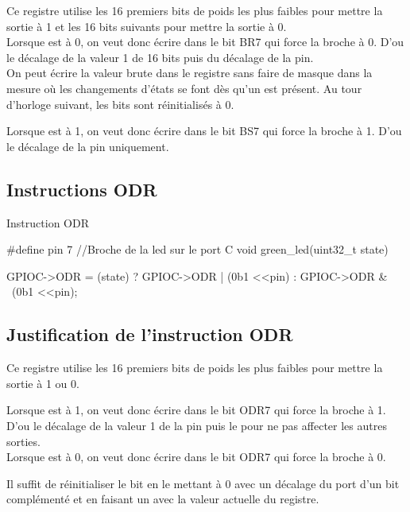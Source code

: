 Ce registre utilise les 16 premiers bits de poids les plus faibles pour mettre la sortie à 1 et 
les 16 bits suivants pour mettre la sortie à 0. \\

Lorsque  est à 0, on veut donc écrire dans le bit BR7 qui force la broche à 0. 
D'ou le décalage de la valeur 1 de 16 bits puis du décalage de la pin. \\
On peut écrire la valeur brute dans le registre sans faire de masque dans la mesure où 
les changements d'états se font dès qu'un  est présent. Au tour d'horloge suivant, les bits sont réinitialisés à 0.

Lorsque  est à 1, on veut donc écrire dans le bit BS7 qui force la broche à 1. 
D'ou le décalage de la pin uniquement. \\



\subsection{Instructions ODR}

\begin{Cpp}{Instruction ODR}
  
  #define pin 7 //Broche de la led sur le port C
  void green_led(uint32_t state) {

    GPIOC->ODR = (state) ? GPIOC->ODR | (0b1 <<pin) : GPIOC->ODR & ~(0b1 <<pin);
     
  }
  

\end{Cpp}

\subsection{Justification de l'instruction ODR}

Ce registre utilise les 16 premiers bits de poids les plus faibles pour mettre la sortie à 1 ou 0.

Lorsque  est à 1, on veut donc écrire dans le bit ODR7 qui force la broche à 1. D'ou le décalage de la valeur 1 de la pin puis le  pour ne pas affecter les autres sorties. \\


Lorsque  est à 0, on veut donc écrire dans le bit ODR7 qui force la broche à 0. 

Il suffit de réinitialiser le bit en le mettant à 0 avec un décalage du port d'un bit complémenté et en faisant un 
avec la valeur actuelle du registre.

